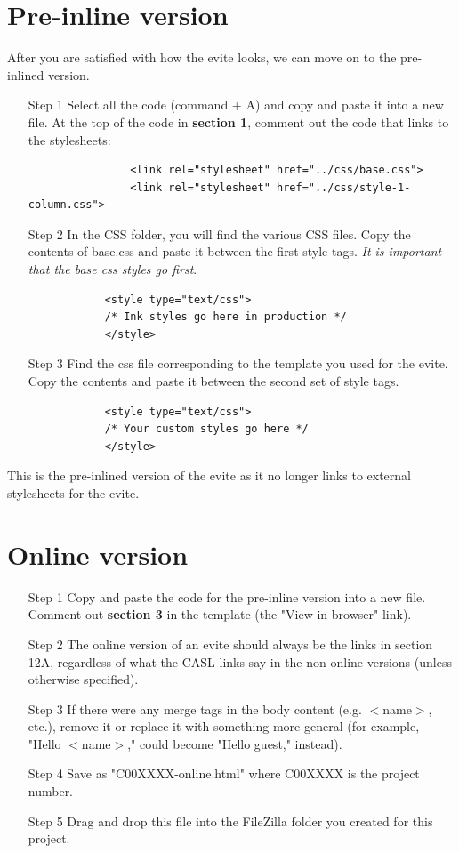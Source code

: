 \documentclass[a4paper,11pt]{article}
\begin{document}
	\section{Pre-inline version}
	After you are satisfied with how the evite looks, we can move on to the pre-inlined version.
	\begin{itemize}
		\item[Step 1] Select all the code (command +  A) and copy and paste it into a new file. At the top of the code in \textbf{section 1}, comment out the code that links to the stylesheets:
			\begin{verbatim}
				<link rel="stylesheet" href="../css/base.css">
				<link rel="stylesheet" href="../css/style-1-column.css">
			\end{verbatim}
		\item[Step 2] In the CSS folder, you will find the various CSS files. Copy the contents of base.css and paste it between the first style tags. \textit{It is important that the base css styles go first}.
			\begin{verbatim}
			<style type="text/css">
			/* Ink styles go here in production */
			</style>
			\end{verbatim}
		\item[Step 3] Find the css file corresponding to the template you used for the evite. Copy the contents and paste it between the second set of style tags. 
			\begin{verbatim}
			<style type="text/css">
			/* Your custom styles go here */
			</style>
			\end{verbatim}
	\end{itemize}
	This is the pre-inlined version of the evite as it no longer links to external stylesheets for the evite.
	
	\section{Online version}
	\begin{itemize}
		\item[Step 1] Copy and paste the code for the pre-inline version into a new file. Comment out \textbf{section 3} in the template (the "View in browser" link). 
		\item[Step 2] The online version of an evite should always be the links in section 12A, regardless of what the CASL links say in the non-online versions (unless otherwise specified).
		\item[Step 3] If there were any merge tags in the body content (e.g. $<$name$>$, etc.), remove it or replace it with something more general (for example, "Hello $<$name$>$," could become "Hello guest," instead). 
		\item[Step 4] Save as "C00XXXX-online.html" where C00XXXX is the project number.
		\item[Step 5] Drag and drop this file into the FileZilla folder you created for this project.
	\end{itemize}
	
\end{document}
